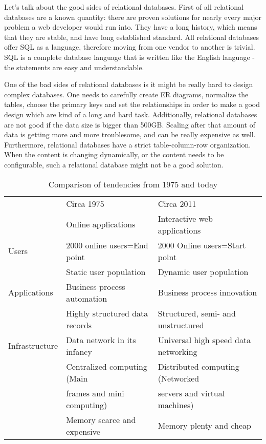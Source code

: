 \documentclass{article}
\begin{document}
Let's talk about the good sides of relational databases. First of all relational databases are a known quantity: there are proven solutions for nearly every major problem a web developer would run into. They have a long history, which means that they are stable, and have long established standard. All relational databases offer SQL as a language, therefore moving from one vendor to another is trivial. SQL is a complete database language that is written like the English language - the statements are easy and understandable. 

One of the bad sides of relational databases is it might be really hard to design complex databases. One needs to carefully create ER diagrams, normalize the tables, choose the primary keys and set the relationships in order to make a good design which are kind of a long and hard task. Additionally, relational databases are not good if the data size is bigger than 500GB. Scaling after that amount of data is getting more and more troublesome, and can be really expensive as well. Furthermore, relational databases have a strict table-column-row organization. When the content is changing dynamically, or the content needs to be configurable, such a relational database might not be a good solution.

\begin{table}[h]
\centering
\begin{tabular}{| l | l | l |}
\hline
				&	Circa 1975						&	Circa 2011	    					\\
				&	Online applications				&	Interactive web applications		\\
\hline \hline
Users 			&	2000 online users=End point		&	2000 Online users=Start point		\\
				&	Static user population			&	Dynamic user population				\\
\hline
Applications 	&	Business process automation		&	Business process innovation			\\
				&	Highly structured data records	&	Structured, semi- and unstructured	\\
\hline
Infrastructure 	&	Data network in its infancy		&	Universal high speed data networking\\
				&	Centralized computing (Main		&	Distributed computing (Networked	\\
				&		frames and mini computing)	&		servers and virtual machines)	\\				
				& 	Memory scarce and expensive		&	Memory plenty and cheap				\\
\hline 
\end{tabular}
	\caption{Comparison of tendencies from 1975 and today}
	\label{tab:nowandthen}
\end{table}
\end{document}
